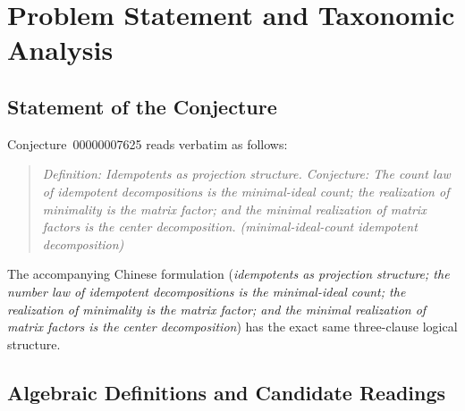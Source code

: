 \documentclass[11pt]{article}
\theoremstyle{definition}
\begin{document}
\section{Problem Statement and Taxonomic Analysis}

\subsection{Statement of the Conjecture}

Conjecture~00000007625 reads verbatim as follows:
\begin{quote}
\emph{Definition: Idempotents as projection structure. Conjecture: The count law
of idempotent decompositions is the minimal-ideal count; the realization of
minimality is the matrix factor; and the minimal realization of matrix factors
is the center decomposition. (minimal-ideal-count idempotent decomposition)}
\end{quote}
The accompanying Chinese formulation (\emph{idempotents as projection structure;
the number law of idempotent decompositions is the minimal-ideal count; the
realization of minimality is the matrix factor; and the minimal realization of
matrix factors is the center decomposition}) has the exact same three-clause
logical structure.

\subsection{Algebraic Definitions and Candidate Readings}
\end{document}
